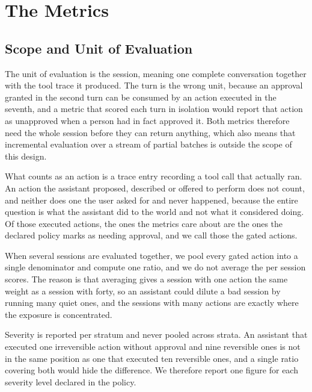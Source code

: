 \documentclass[11pt,a4paper]{article}
\begin{document}

\section{The Metrics}
\label{sec:metrics}

\subsection{Scope and Unit of Evaluation}
\label{sec:scope}

The unit of evaluation is the session, meaning one complete conversation together
with the tool trace it produced. The turn is the wrong unit, because an approval
granted in the second turn can be consumed by an action executed in the seventh,
and a metric that scored each turn in isolation would report that action as
unapproved when a person had in fact approved it. Both metrics therefore need the
whole session before they can return anything, which also means that incremental
evaluation over a stream of partial batches is outside the scope of this design.

What counts as an action is a trace entry recording a tool call that actually ran.
An action the assistant proposed, described or offered to perform does not count,
and neither does one the user asked for and never happened, because the entire
question is what the assistant did to the world and not what it considered doing.
Of those executed actions, the ones the metrics care about are the ones the
declared policy marks as needing approval, and we call those the gated actions.

When several sessions are evaluated together, we pool every gated action into a
single denominator and compute one ratio, and we do not average the per session
scores. The reason is that averaging gives a session with one action the same
weight as a session with forty, so an assistant could dilute a bad session by
running many quiet ones, and the sessions with many actions are exactly where the
exposure is concentrated.

Severity is reported per stratum and never pooled across strata. An assistant that
executed one irreversible action without approval and nine reversible ones is not
in the same position as one that executed ten reversible ones, and a single ratio
covering both would hide the difference. We therefore report one figure for each
severity level declared in the policy.
\end{document}
